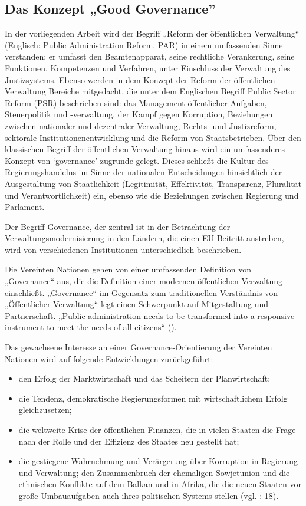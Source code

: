 \subsection{Das Konzept „Good Governance”}
In der vorliegenden Arbeit wird der Begriff „Reform der öffentlichen Verwaltung“ (Englisch: Public Administration Reform, PAR) in einem umfassenden Sinne verstanden; er umfasst den Beamtenapparat, seine rechtliche Verankerung, seine Funktionen, Kompetenzen und Verfahren, unter Einschluss der Verwaltung des Justizsystems. Ebenso werden in dem Konzept der Reform der öffentlichen Verwaltung Bereiche mitgedacht, die unter dem Englischen Begriff Public Sector Reform (PSR) beschrieben sind: das Management öffentlicher Aufgaben, Steuerpolitik und -verwaltung, der Kampf gegen Korruption, Beziehungen zwischen nationaler und dezentraler Verwaltung, Rechts- und Justizreform, sektorale Institutionenentwicklung und die Reform von Staatsbetrieben. Über den klassischen Begriff der öffentlichen Verwaltung hinaus wird ein umfassenderes Konzept von ‘governance’ zugrunde gelegt. Dieses schließt die Kultur des Regierungshandelns im Sinne der nationalen Entscheidungen hinsichtlich der Ausgestaltung von Staatlichkeit (Legitimität, Effektivität, Transparenz, Pluralität und Verantwortlichkeit) ein, ebenso wie die Beziehungen zwischen Regierung und Parlament.\par
Der Begriff Governance, der zentral ist in der Betrachtung der Verwaltungsmodernisierung in den Ländern, die einen EU-Beitritt anstreben, wird von verschiedenen Institutionen unterschiedlich beschrieben.\par
Die Vereinten Nationen gehen von einer umfassenden Definition von „Governance“ aus, die die Definition einer modernen öffentlichen Verwaltung einschließt. „Governance“ im Gegensatz zum traditionellen Verständnis von „Öffentlicher Verwaltung“ legt einen Schwerpunkt auf Mitgestaltung und Partnerschaft. „Public administration needs to be transformed into a responsive instrument to meet the needs of all citizens“ (\cite{unpan}).\par
Das gewachsene Interesse an einer Governance-Orientierung der Vereinten Nationen wird auf folgende Entwicklungen zurückgeführt:
\begin{itemize} \itemsep1pt \parskip0pt 
\item den Erfolg der Marktwirtschaft und das Scheitern der Planwirtschaft;
\item die Tendenz, demokratische Regierungsformen mit wirtschaftlichem Erfolg gleichzusetzen;
\item die weltweite Krise der öffentlichen Finanzen, die in vielen Staaten die Frage nach der Rolle und der Effizienz des Staates neu gestellt hat; 
\item die gestiegene Wahrnehmung und Verärgerung über Korruption in Regierung und Verwaltung;
den Zusammenbruch der ehemaligen Sowjetunion und die ethnischen Konflikte auf dem Balkan und in Afrika, die die neuen Staaten vor große Umbauaufgaben auch ihres politischen Systems stellen (vgl. \cite{undp} : 18).
\end{itemize}
